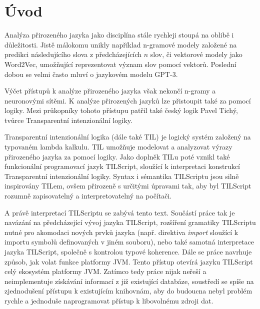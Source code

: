\chapter{Úvod}
\label{sec:Introduction}


Analýza přirozeného jazyka jako disciplína stále rychleji stoupá na oblibě i důležitosti. Jistě
málokomu unikly například n-gramové modely založené na predikci následujícího slova
z předcházejících $n$ slov, či vektorové modely jako Word2Vec, umožňující reprezentovat význam
slov pomocí vektorů. Poslední dobou se velmi často mluví o jazykovém modelu GPT-3.

Výčet přístupů k analýze přirozeného jazyka však nekončí n-gramy a neuronovými sítěmi. K analýze
přirozených jazyků lze přistoupit také za pomocí logiky. Mezi průkopníky tohoto přístupu patřil
také český logik Pavel Tichý, tvůrce Transparentní intenzionální logiky.

Transparentní intenzionální logika (dále také TIL) je logický systém založený na typovaném lambda
kalkulu. TIL umožňuje modelovat a analyzovat výrazy přirozeného jazyka za pomocí logiky. Jako
doplněk TILu poté vznikl také funkcionální programovací jazyk TILScript, sloužící k interpretaci
konstrukcí Transparentní intenzionální logiky. Syntax i sémantika TILScriptu jsou silně inspirovány
TILem, ovšem přirozeně s určitými úpravami tak, aby byl TILScript rozumně zapisovatelný
a interpretovatelný na počítači.

A právě interpretací TILScriptu se zabývá tento text. Součástí práce tak je navázání
na předcházející vývoj jazyka TILScript, rozšíření gramatiky TILScriptu nutné pro akomodaci nových
prvků jazyka (např. direktiva \textit{import} sloužící k importu symbolů definovaných v jiném
souboru), nebo také samotná interpretace jazyka TILScript, společně s kontrolou typové koherence.
Dále se práce navrhuje způsob, jak volat funkce platformy JVM. Tento přístup otevírá jazyku
TILScript celý ekosystém platformy JVM. Zatímco tedy práce nijak neřeší a neimplementuje získávání
informací z již existující databáze, soustředí se spíše na zjednodušení přístupu k existujícím
knihovnám, aby do budoucna nebyl problém rychle a jednoduše naprogramovat přístup k libovolnému
zdroji dat.

